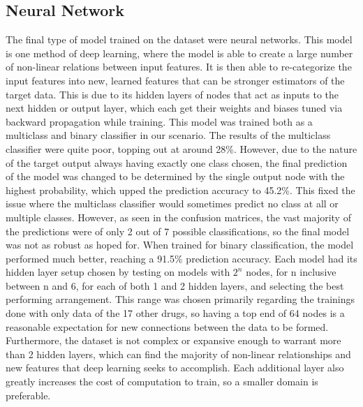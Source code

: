 \documentclass{article}
\begin{document}
\subsection{Neural Network}
\vspace*{-2mm}
The final type of model trained on the dataset were neural networks. This model is one method of deep learning, where the model is able to create a large number of non-linear relations between input features. It is then able to re-categorize the input features into new, learned features that can be stronger estimators of the target data. This is due to its hidden layers of nodes that act as inputs to the next hidden or output layer, which each get their weights and biases tuned via backward propagation while training. This model was trained both as a multiclass and binary classifier in our scenario. The results of the multiclass classifier were quite poor, topping out at around 28\%. However, due to the nature of the target output always having exactly one class chosen, the final prediction of the model was changed to be determined by the single output node with the highest probability, which upped the prediction accuracy to 45.2\%. This fixed the issue where the multiclass classifier would sometimes predict no class at all or multiple classes. However, as seen in the confusion matrices, the vast majority of the predictions were of only 2 out of 7 possible classifications, so the final model was not as robust as hoped for. When trained for binary classification, the model performed much better, reaching a 91.5\% prediction accuracy. Each model had its hidden layer setup chosen by testing on models with $2^{n}$ nodes, for n inclusive between n and 6, for each of both 1 and 2 hidden layers, and selecting the best performing arrangement. This range was chosen primarily regarding the trainings done with only data of the 17 other drugs, so having a top end of 64 nodes is a reasonable expectation for new connections between the data to be formed. Furthermore, the dataset is not complex or expansive enough to warrant more than 2 hidden layers, which can find the majority of non-linear relationships and new features that deep learning seeks to accomplish. Each additional layer also greatly increases the cost of computation to train, so a smaller domain is preferable.
\vspace*{-4mm}
\end{document}
